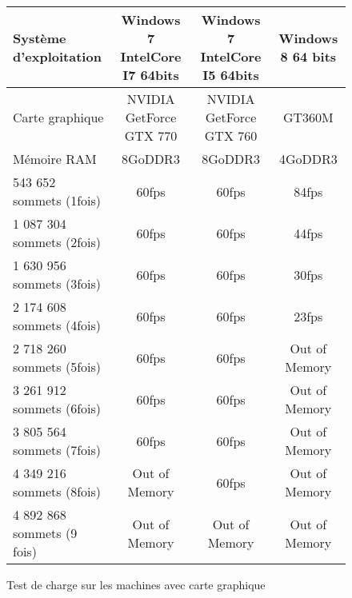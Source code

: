 \begin{figure}[h]
  \begin{changemargin}{-4cm}{-4cm}
    \centering
    \begin{tabular}{|l|c|c|c|}
      \hline
      Système d'exploitation & Windows 7 IntelCore I7 64bits & Windows 7 IntelCore I5 64bits & Windows 8 64 bits\\ \hline
      Carte graphique &  NVIDIA GetForce GTX 770 & NVIDIA GetForce GTX 760 & GT360M\\ \hline
      Mémoire RAM & 8GoDDR3 & 8GoDDR3 & 4GoDDR3 \\ \hline \hline
      543 652 sommets (1fois) & 60fps & 60fps & 84fps \\ \hline
      1 087 304 sommets (2fois) & 60fps & 60fps & 44fps \\ \hline
      1 630 956 sommets (3fois) & 60fps & 60fps & 30fps \\ \hline
      2 174 608 sommets (4fois) & 60fps & 60fps & 23fps \\ \hline
      2 718 260 sommets (5fois) & 60fps & 60fps & Out of Memory \\ \hline
      3 261 912 sommets (6fois) & 60fps & 60fps & Out of Memory \\ \hline
      3 805 564 sommets (7fois) & 60fps & 60fps & Out of Memory \\ \hline
      4 349 216 sommets (8fois) & Out of Memory & 60fps & Out of Memory  \\ \hline
      4 892 868 sommets (9 fois) & Out of Memory & Out of Memory & Out of Memory \\ \hline
    \end{tabular}
  \end{changemargin}
  \caption{Test de charge sur les machines avec carte graphique}
  \label{tab:charge_cg}
\end{figure}

